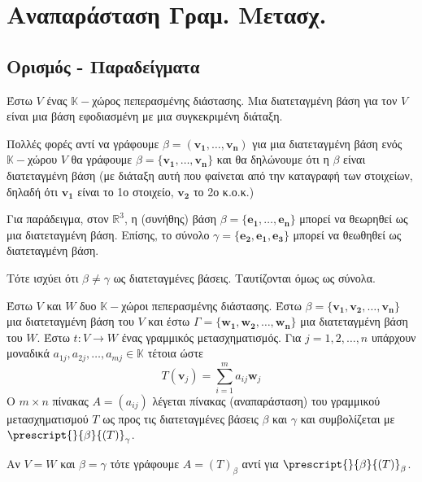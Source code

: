



\pagestyle{vangelis}




\chapter{Αναπαράσταση Γραμ. Μετασχ.}

\section{Ορισμός - Παραδείγματα}

\begin{dfn}
  Έστω  $V$  ένας  $ \mathbb{K}- $χώρος πεπερασμένης διάστασης. Μια
  \textcolor{Col1}{διατεταγμένη βάση} για τον $V$ είναι μια βάση εφοδιασμένη με μια 
  συγκεκριμένη διάταξη.
\end{dfn}

\begin{rem}
  Πολλές φορές αντί να γράφουμε $ \beta = (\mathbf{v_{1}}, \ldots, \mathbf{v_{n}}) $ για 
  μια διατεταγμένη βάση ενός $ \mathbb{K}- $χώρου $V$ θα γράφουμε 
  $ \beta = \{ \mathbf{v_{1}}, \ldots, \mathbf{v_{n}} \} $ και θα δηλώνουμε ότι η 
  $ \beta $ είναι διατεταγμένη βάση (με διάταξη αυτή που φαίνεται από την καταγραφή 
  των στοιχείων, δηλαδή ότι $ \mathbf{v_{1}} $ είναι το 1ο στοιχείο, 
  $ \mathbf{v_{2}} $ το 2ο κ.ο.κ.) 
\end{rem}

Για παράδειγμα, στον $ \mathbb{R}^{3} $, η (συνήθης) βάση $ \beta = \{ \mathbf{e_{1}}, 
\ldots, \mathbf{e_{n}}\} $ μπορεί να θεωρηθεί ως μια διατεταγμένη βάση. 
Επίσης, το σύνολο $ \gamma = \{ \mathbf{e_{2}}, \mathbf{e_{1}}, \mathbf{e_{3}} \} $ 
μπορεί να θεωθηθεί ως διατεταγμένη βάση. 

Τότε ισχύει ότι $ \beta \neq \gamma $ ως διατεταγμένες βάσεις. 
Ταυτίζονται όμως ως σύνολα.  
\begin{dfn}
  Έστω $V$ και $W$ δυο $ \mathbb{K}- $χώροι πεπερασμένης διάστασης. Έστω $ \beta = \{
  \mathbf{v_{1}}, \mathbf{v_{2}}, \ldots, \mathbf{v_{n}} \} $ μια διατεταγμένη βάση 
  του $V$ και έστω $ \Gamma = \{ \mathbf{w_{1}}, \mathbf{w_{2}}, \ldots, 
  \mathbf{w_{n}} \} $ μια διατεταγμένη βάση του $W$. Έστω $ t \colon V \to W $ ένας 
  γραμμικός μετασχηματισμός. Για $ j = 1,2, \ldots, n $ υπάρχουν μοναδικά $ a_{1j}, 
  a_{2j}, \ldots, a_{mj} \in \mathbb{K} $ τέτοια ώστε 
  \[
    T(\mathbf{v}_{j}) = \sum_{i=1}^{m} a_{ij} \mathbf{w}_{j}  
  \] 
  Ο $ m \times n $ πίνακας $A = (a_{ij}) $ λέγεται πίνακας (αναπαράσταση) του 
  γραμμικού μετασχηματισμού $T$ ως προς τις διατεταγμένες βάσεις $ \beta $ και 
  $ \gamma $ και συμβολίζεται με $ \prescript{}{\beta}{(T)}_{\gamma } $.
\end{dfn}

\begin{rem}
  Αν $ V=W $ και $ \beta = \gamma $ τότε γράφουμε $ A = (T)_{\beta} $ αντί για 
  $ \prescript{}{\beta }{(T)}_{\beta} $.
\end{rem}











